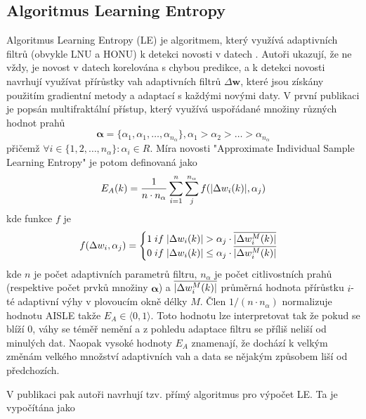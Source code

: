 \subsection{Algoritmus Learning Entropy}\label{chap:LE}
Algoritmus Learning Entropy (LE) je algoritmem, který využívá adaptivních filtrů (obvykle LNU a HONU) k detekci novosti v datech \cite{ivoLE1,ivoLE2}. Autoři ukazují, že ne vždy, je novost v datech korelována s chybou predikce, a k detekci novosti navrhují využívat přírůstky vah adaptivních filtrů $\Delta\textbf{w}$, které jsou získány použitím gradientní metody a adaptací s každými novými daty. V první publikaci \cite{ivoLE1} je popsán multifraktální přístup, který využívá uspořádané množiny různých hodnot prahů
\begin{equation}
\boldsymbol{\alpha}=\{ \alpha_1,\alpha_1,\dots,\alpha_{n_{\alpha}} \}, \alpha_1>\alpha_2>\dots>\alpha_{n_{\alpha}}
\end{equation}
přičemž $\forall i \in \{1,2,\dots,n_{\alpha} \}:\alpha_i\in R$. Míra novosti "Approximate Individual Sample Learning Entropy" je potom definovaná jako
\begin{equation}\label{eq:aisle}
E_A(k)=\frac{1}{n\cdot n_{\alpha}}\sum_{i=1}^{n}\sum_j^{n_{\alpha}} f(\lvert\Delta w_i(k)\rvert, \alpha_j)
\end{equation}
kde funkce $f$ je
\begin{equation}
f(\Delta w_i, \alpha_j)=\begin{cases}
1 \; if \; \lvert\Delta w_i(k)\rvert>\alpha_{j} \cdot \overline{\lvert\Delta w_i^M(k)\rvert}\\
0 \; if \; \lvert\Delta w_i(k)\rvert\leq \alpha_j \cdot \overline{\lvert\Delta w_i^M(k)\rvert}


\end{cases}
\end{equation}
kde $n$ je počet adaptivních parametrů filtru, $n_{\alpha}$ je počet citlivostních prahů (respektive počet prvků množiny $\boldsymbol{\alpha}$) a $\overline{\lvert\Delta w_i^M(k)\rvert}$ průměrná hodnota přírůstku $i$-té adaptivní výhy v plovoucím okně délky $M$. Člen $1/(n\cdot n_{\alpha})$ normalizuje hodnotu AISLE takže  $E_A \in \langle 0,1\rangle$. Toto hodnotu lze interpretovat tak že pokud se blíží 0, váhy se téměř nemění a z pohledu adaptace filtru se příliš neliší od minulých dat. Naopak vysoké hodnoty $E_A$ znamenají, že dochází k velkým změnám velkého množství adaptivních vah a data se nějakým způsobem liší od předchozích. 
\par
V publikaci \cite{ivoLE2} pak autoři navrhují tzv. přímý algoritmus pro výpočet LE. Ta je vypočítána jako
